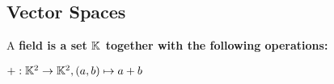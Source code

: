 \subsection{Vector Spaces}

\begin{definition}
	A \bf{field} is a set $\mathbb{K}$ together with the following operations:
	\begin{itemize}
		$+ : \mathbb{K}^2 \to \mathbb{K}^2, (a,b) \mapsto a+b$ 
	\end{itemize}
\end{definition}
